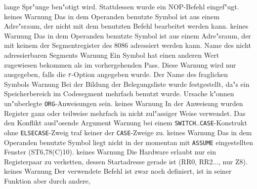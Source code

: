 \documentclass[12pt,a4paper,twoside]{report}
\newcommand{\tty}[1]{{\tt #1}}
\begin{document}
\begin{description}
{                lange Spr"unge ben"otigt wird.  Stattdessen wurde ein
                NOP-Befehl eingef"ugt.}
               {keines}
               {Warnung}
               {Das in dem Operanden benutzte Symbol
                ist aus einem Adre"sraum, der nicht mit dem benutzten
                Befehl bearbeitet werden kann.}
               {keines}
               {Warnung}
               {Das in dem Operanden benutzte Symbol
                ist aus einem Adre"sraum, der mit keinem der Segmentregister
                des 8086 adressiert werden kann.}
               {Name des nicht adressierbaren Segments}
               {Warnung}
               {Ein Symbol hat einen anderen Wert zugewiesen
                bekommen als im vorhergehenden Pass.  Diese Warnung wird
                nur ausgegeben, falls die \tty{r}-Option angegeben wurde.}
               {Der Name des fraglichen Symbols}
               {Warnung}
               {Bei der Bildung der Belegungsliste wurde
                festgestellt, da"s ein Speicherbereich im Codesegment
                mehrfach benutzt wurde.  Ursache k"onnen un"uberlegte
                \tty{ORG}-Anweisungen sein.}
               {keines}
               {Warnung}
               {In der Anweisung wurden Register ganz oder teilweise
                mehrfach in nicht zul"assiger Weise verwendet.}
               {Das den Konflikt ausl"osende Argument}
               {Warnung}
               {bei einem \tty{SWITCH}..\tty{CASE}-Konstrukt ohne
                \tty{ELSECASE}-Zweig traf keiner der \tty{CASE}-Zweige zu.}
               {keines}
               {Warnung}
               {Das in dem Operanden benutzte Symbol
                liegt nicht in der momentan mit \tty{ASSUME} eingestellten
                Fenster (ST6,78(C)10).}
               {keines}
               {Warnung}
               {Die Hardware erlaubt nur ein Registerpaar
                zu verketten, dessen Startadresse gerade ist (RR0, RR2...,
                nur Z8).}
               {keines}
               {Warnung}
               {Der verwendete Befehl ist zwar noch
                definiert, ist in seiner Funktion aber durch andere,
}
\end{description}
\end{document}
